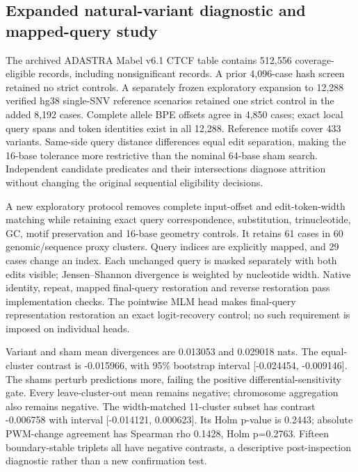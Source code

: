 \subsection{Expanded natural-variant diagnostic and mapped-query study}
The archived ADASTRA Mabel v6.1 CTCF table \citep{adastra2024release,abramov2021adastra} contains 512,556 coverage-eligible
records, including nonsignificant records. A prior 4,096-case hash screen retained
no strict controls. A separately frozen exploratory expansion to 12,288 verified
hg38 single-SNV reference scenarios retained one strict control in the added 8,192
cases. Complete allele BPE offsets agree in 4,850 cases; exact local query spans
and token identities exist in all 12,288. Reference motifs cover 433 variants.
Same-side query distance differences equal edit separation, making the 16-base
tolerance more restrictive than the nominal 64-base sham search. Independent
candidate predicates and their intersections diagnose attrition without changing
the original sequential eligibility decisions.

A new exploratory protocol removes complete input-offset and edit-token-width
matching while retaining exact query correspondence, substitution, trinucleotide,
GC, motif preservation and 16-base geometry controls. It retains 61 cases in 60
genomic/sequence proxy clusters. Query indices are explicitly mapped, and 29 cases
change an index. Each unchanged query is masked separately with both edits visible;
Jensen--Shannon divergence is weighted by nucleotide width. Native identity, repeat,
mapped final-query restoration and reverse restoration pass implementation checks.
The pointwise MLM head makes final-query representation restoration an exact
logit-recovery control; no such requirement is imposed on individual heads.

Variant and sham mean divergences are 0.013053
and 0.029018 nats. The equal-cluster contrast is
-0.015966, with 95\% bootstrap interval
[-0.024454, -0.009146]. The shams perturb predictions more,
failing the positive differential-sensitivity gate. Every leave-cluster-out mean
remains negative; chromosome aggregation also remains negative. The width-matched
11-cluster subset has contrast -0.006758 with interval
[-0.014121, 0.000623]. Its Holm p-value
is 0.2443; absolute PWM-change agreement has Spearman
rho 0.1428, Holm p=0.2763.
Fifteen boundary-stable triplets all have negative contrasts, a descriptive
post-inspection diagnostic rather than a new confirmation test.

